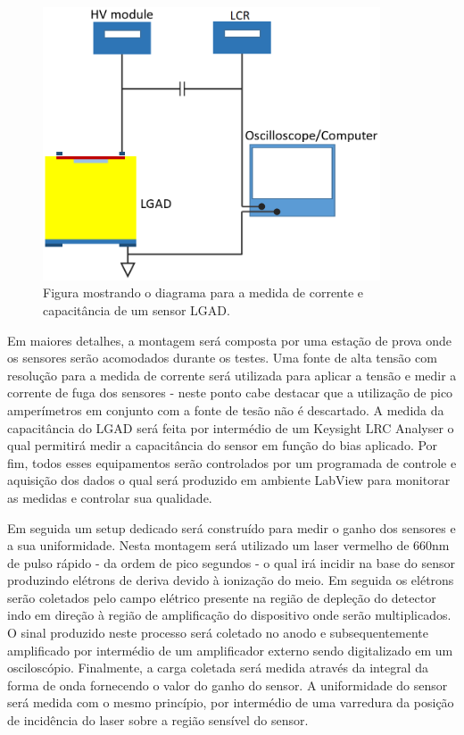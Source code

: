 \begin{figure}
    \centering
    \includegraphics[width=10.0cm]{assets/iv_cv.png}
    \caption{Figura mostrando o diagrama para a medida de corrente e capacitância de um sensor LGAD.}
    \label{setup1}
\end{figure}

Em maiores detalhes, a montagem será composta por uma estação de prova onde os sensores serão acomodados durante os testes. Uma fonte de alta tensão com resolução para a medida de corrente será utilizada para aplicar a tensão e medir a corrente de fuga dos sensores - neste ponto cabe destacar que a utilização de pico amperímetros em conjunto com a fonte de tesão não é descartado. A medida da capacitância do LGAD será feita por intermédio de um Keysight LRC Analyser o qual permitirá medir a capacitância do sensor em função do bias aplicado. Por fim, todos esses equipamentos serão controlados por um programada de controle e aquisição dos dados o qual será produzido em ambiente LabView para monitorar as medidas e controlar sua qualidade.

Em seguida um setup dedicado será construído para medir o ganho dos sensores e a sua uniformidade. Nesta montagem será utilizado um laser vermelho de 660nm de pulso rápido - da ordem de pico segundos - o qual irá incidir na base do sensor produzindo elétrons de deriva devido à ionização do meio. Em seguida os elétrons serão coletados pelo campo elétrico presente na região de depleção do detector indo em direção à região de amplificação do dispositivo onde serão multiplicados. O sinal produzido neste processo será coletado no anodo e subsequentemente amplificado por intermédio de um amplificador externo sendo digitalizado em um osciloscópio. Finalmente, a carga coletada será medida através da integral da forma de onda fornecendo o valor do ganho do sensor. A uniformidade do sensor será medida com o mesmo princípio, por intermédio de uma varredura da posição de incidência do laser sobre a região sensível do sensor.

